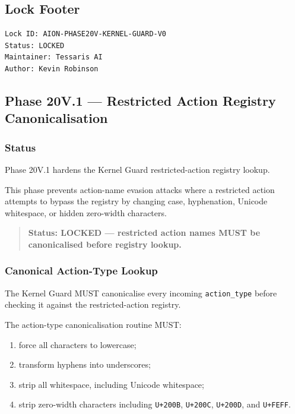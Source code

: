 \subsection{Lock Footer}

\begin{verbatim}
Lock ID: AION-PHASE20V-KERNEL-GUARD-V0
Status: LOCKED
Maintainer: Tessaris AI
Author: Kevin Robinson
\end{verbatim}

\subsection{Phase 20V.1 --- Restricted Action Registry Canonicalisation}

\subsubsection{Status}

Phase 20V.1 hardens the Kernel Guard restricted-action registry lookup.

This phase prevents action-name evasion attacks where a restricted action attempts to bypass the registry by changing case, hyphenation, Unicode whitespace, or hidden zero-width characters.

\begin{quote}
\textbf{Status: LOCKED --- restricted action names MUST be canonicalised before registry lookup.}
\end{quote}

\subsubsection{Canonical Action-Type Lookup}

The Kernel Guard MUST canonicalise every incoming \texttt{action\_type} before checking it against the restricted-action registry.

The action-type canonicalisation routine MUST:

\begin{enumerate}
  \item force all characters to lowercase;
  \item transform hyphens into underscores;
  \item strip all whitespace, including Unicode whitespace;
  \item strip zero-width characters including \texttt{U+200B}, \texttt{U+200C}, \texttt{U+200D}, and \texttt{U+FEFF}.
\end{enumerate}

